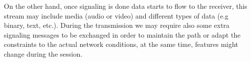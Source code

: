 On the other hand, once signaling is done data starts to flow to the receiver, this stream may include media (audio or video) and different types of data (e.g binary, text, etc.). During the transmission we may require also some extra signaling messages to be exchanged in order to maintain the path or adapt the constraints to the actual network conditions, at the same time, features might change during the session. 



